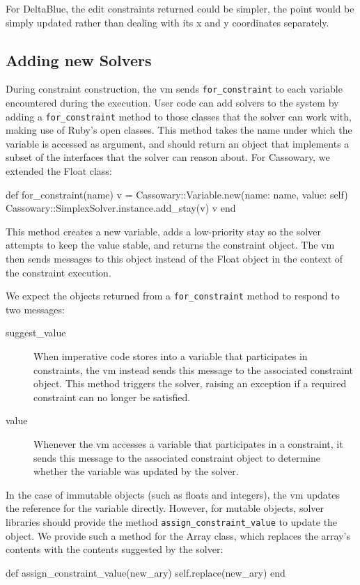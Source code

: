 For DeltaBlue, the edit constraints returned could be simpler, \eg the
point would be simply updated rather than dealing with its x and y
coordinates separately.

\subsection{Adding new Solvers}
\label{sec:solver-interface}

During constraint construction, the \ac{vm} sends
\lstinline{for_constraint} to each variable encountered during the
execution. User code can add solvers to the system by adding a
\lstinline{for_constraint} method to those classes that the solver can
work with, making use of Ruby's open classes. This method takes the
name under which the variable is accessed as argument, and should
return an object that implements a subset of the interfaces
that the solver can reason about. For Cassowary, we extended the Float
class:
\begin{code}
  def for_constraint(name)
    v = Cassowary::Variable.new(name: name, value: self)
    Cassowary::SimplexSolver.instance.add_stay(v)
    v
  end
\end{code}

This method creates a new variable, adds a low-priority stay so the solver
attempts to keep the value stable, and returns the constraint
object. The \ac{vm} then sends messages to this object instead of the
Float object in the context of the constraint execution.

We expect the objects returned from a \lstinline{for_constraint}
method to respond to two messages:
\begin{description}
\item[suggest\_value] When imperative code stores into a variable that
  participates in constraints, the \ac{vm} instead sends this message
  to the associated constraint object. This method triggers the
  solver, raising an exception if a required constraint can no longer
  be satisfied.
\item[value] Whenever the \ac{vm} accesses a variable that
  participates in a constraint, it sends this message to the
  associated constraint object to determine whether the variable was
  updated by the solver.
\end{description}

In the case of immutable objects (such as floats and integers), the
\ac{vm} updates the reference for the variable directly. However, for
mutable objects, solver libraries should provide the method
\lstinline{assign_constraint_value} to update the object. We provide
such a method for the Array class, which replaces the array's contents
with the contents suggested by the solver:
\begin{code}
  def assign_constraint_value(new_ary)
    self.replace(new_ary)
  end
\end{code}

